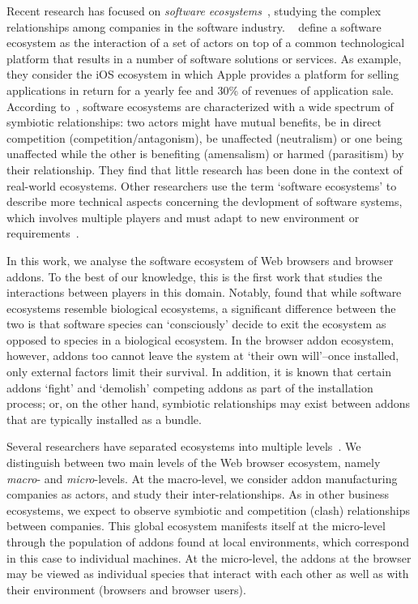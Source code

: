 \documentclass[ijoc,nonblindrev]{informs3} %
\numberwithin{equation}{subsection}
\begin{document}
Recent research has focused on \emph{software ecosystems}~\citep{messerschmitt2005software,dhungana2010software,manikas13,jansen13}, studying the complex relationships among companies in the software industry. ~\cite{manikas13} define a software ecosystem as the interaction of a set of actors on top of a common technological platform that results in a number of software solutions or services. As example, they consider the iOS ecosystem in which Apple provides a platform for selling applications in return for a yearly fee and 30\% of revenues of application sale. According to~\cite{manikas13}, software ecosystems are characterized with a wide spectrum of symbiotic relationships: two actors might have mutual benefits, be in direct competition (competition/antagonism), be unaffected (neutralism) or one being unaffected while the other is benefiting (amensalism) or harmed (parasitism) by their relationship. They find that little research has been done in the context of real-world ecosystems. Other researchers use the term `software ecosystems' to describe more technical aspects concerning the devlopment of software systems, which involves multiple players and must adapt to new environment or requirements~\citep{lunguPhd09,blincoeMSR15}. 

In this work, we analyse the software ecosystem of Web browsers and browser addons. To the best of our knowledge, this is the first work that studies the interactions between players in this domain. Notably, \cite{jansen2013defining} found that while software ecosystems resemble biological ecosystems, a significant difference between the two is that software species can `consciously' decide to exit the ecosystem as opposed to species in a biological ecosystem. In the browser addon ecosystem, however, addons too cannot leave the system at `their own will'--once installed, only external factors limit their survival. In addition, it is known that certain addons `fight' and `demolish' competing addons as part of the installation process; or, on the other hand, symbiotic relationships may exist between addons that are typically installed as a bundle. 

Several researchers have separated ecosystems into multiple levels~\citep{boucharas2009formalizing, jansen2013defining}. We distinguish between two main levels of the Web browser ecosystem, namely \emph{macro}- and \emph{micro}-levels. At the macro-level, we consider addon manufacturing companies as actors, and study their inter-relationships. As in other business ecosystems, we expect to observe symbiotic and competition (clash) relationships between companies. This global ecosystem manifests itself at the micro-level through the population of addons found at local environments, which correspond in this case to individual machines. At the micro-level, the addons at the browser may be viewed as individual species that interact with each other as well as with their environment (browsers and browser users).
\end{document}
